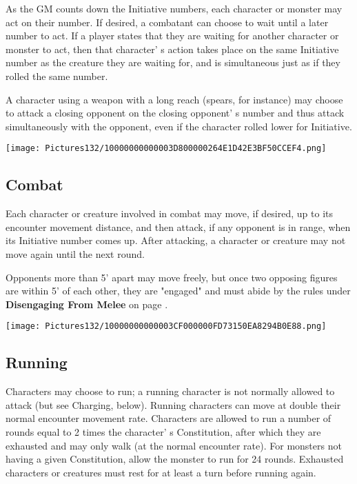 \documentclass[a4paper,twoside,openany,10pt]{book}
\begin{document}
\begin{multicols}{2}
As the GM counts down the Initiative numbers, each character or monster may act on their number. If desired, a combatant can choose to wait until a later number to act. If a player states that they are waiting for another character or monster to act, then that character' s action takes place on the same Initiative number as the creature they are waiting for, and is simultaneous just as if they rolled the same number.

A character using a weapon with a long reach (spears, for instance) may choose to attack a closing opponent on the closing opponent' s number and thus attack simultaneously with the opponent, even if the character rolled lower for Initiative.

\begin{flushleft}
	\texttt{[image: Pictures132/10000000000003D800000264E1D42E3BF50CCEF4.png]}
\end{flushleft}

\subsection{Combat}\label{combat}

Each character or creature involved in combat may move, if desired, up to its encounter movement distance, and then attack, if any opponent is in range, when its Initiative number comes up. After attacking, a character or creature may not move again until the next round.

Opponents more than 5' apart may move freely, but once
two opposing figures are within 5' of each other, they
are "engaged" and must abide by the rules under \textbf{Disengaging From
Melee }on page \hyperlink{disengaging-from-melee}{\pageref{disengaging-from-melee}}.

\begin{flushleft}
	\texttt{[image: Pictures132/10000000000003CF000000FD73150EA8294B0E88.png]}
\end{flushleft}

\subsection{Running}\label{running}

Characters may choose to run; a running character is not normally allowed to attack (but see Charging, below). Running characters can move at double their normal encounter movement rate. Characters are allowed to run a number of rounds equal to 2 times the character' s Constitution, after which they are exhausted and may only walk (at the normal encounter rate). For monsters not having a given Constitution, allow the monster to run for 24 rounds. Exhausted characters or creatures must rest for at least a turn before running again.


\end{multicols}
\end{document}
